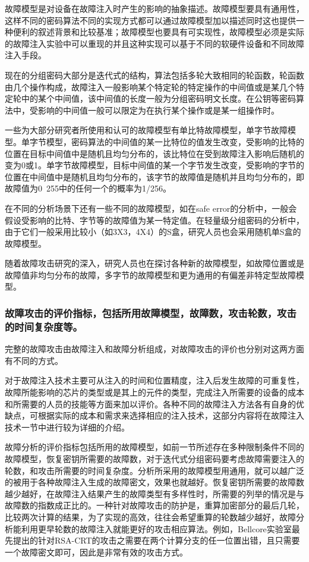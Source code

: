 \documentclass[a4paper,12pt]{article}
\begin{document}
\begin{CJK}{UTF8}{gkai}
故障模型是对设备在故障注入时产生的影响的抽象描述。故障模型要具有通用性，这样不同的密码算法不同的实现方式都可以通过故障模型加以描述同时这也提供一种便利的叙述背景和比较基准；故障模型也要具有可实现性，故障模型必须是实际的故障注入实验中可以重现的并且这种实现可以基于不同的软硬件设备和不同故障注入手段。

现在的分组密码大部分是迭代式的结构，算法包括多轮大致相同的轮函数，轮函数由几个操作构成，故障注入一般影响某个特定轮的特定操作的中间值或是某几个特定轮中的某个中间值，该中间值的长度一般为分组密码明文长度。在公钥等密码算法中，受影响的中间值一般可以限定为在执行某个操作或是某一组操作时。

一些为大部分研究者所使用和认可的故障模型有单比特故障模型，单字节故障模型。单字节模型，密码算法的中间值的某一比特位的值发生改变，受影响的比特的位置在目标中间值中是随机且均匀分布的，该比特位在受到故障注入影响后随机的变为0或1。单字节故障模型，目标中间值的某一个字节发生改变，受影响的字节的位置在中间值中是随机且均匀分布的，该字节的故障值是随机并且均匀分布的，即故障值为0~255中的任何一个的概率为1/256。

在不同的分析场景下还有一些不同的故障模型，如在safe  error的分析中，一般会假设受影响的比特、字节等的故障值为某一特定值。在轻量级分组密码的分析中，由于它们一般采用比较小（如3X3，4X4）的S盒，研究人员也会采用随机单S盒的故障模型。

随着故障攻击研究的深入，研究人员也在探讨各种新的故障模型，如故障位置或是故障值非均匀分布的故障，多字节的故障模型和更为通用的有偏差非特定型故障模型。

\subsubsection{故障攻击的评价指标，包括所用故障模型，故障数，攻击轮数，攻击的时间复杂度等。}
完整的故障攻击由故障注入和故障分析组成，对故障攻击的评价也分别对这两方面有不同的方式。

对于故障注入技术主要可从注入的时间和位置精度，注入后发生故障的可重复性，故障所能影响的芯片的类型或是其上的元件的类型，完成注入所需要的设备的成本和所需要的人员的技能等方面来加以评价。各种不同的故障注入方法各有自身的优缺点，可根据实际的成本和需求来选择相应的注入技术，这部分内容将在故障注入技术一节中进行较为详细的介绍。

故障分析的评价指标包括所用的故障模型，如前一节所述存在多种限制条件不同的故障模型，恢复密钥所需要的故障数，对于迭代式分组密码要考虑故障需要注入的轮数，和攻击所需要的时间复杂度。分析所采用的故障模型用通用，就可以越广泛的被用于各种故障注入生成的故障密文，效果也就越好。恢复密钥所需要的故障数越少越好，在故障注入结果产生的故障类型有多样性时，所需要的列举的情况是与故障数的指数成正比的。一种针对故障攻击的防护是，重算加密部分的最后几轮，比较两次计算的结果，为了实现的高效，往往会希望重算的轮数越少越好，故障分析能利用更早轮数的故障注入就能更好的攻击相应算法。例如，Bellcore实验室最先提出的针对RSA-CRT的攻击之需要在两个计算分支的任一位置出错，且只需要一个故障密文即可，因此是非常有效的攻击方式。


\end{CJK}
\end{document}
